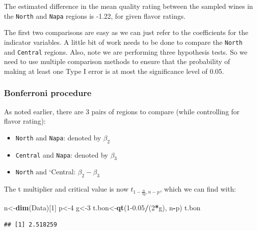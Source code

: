 \documentclass[
]{book}
\newenvironment{Shaded}{\begin{snugshade}}{\end{snugshade}}
\newcommand{\DecValTok}[1]{\textcolor[rgb]{0.00,0.00,0.81}{#1}}
\newcommand{\FloatTok}[1]{\textcolor[rgb]{0.00,0.00,0.81}{#1}}
\newcommand{\FunctionTok}[1]{\textcolor[rgb]{0.13,0.29,0.53}{\textbf{#1}}}
\newcommand{\NormalTok}[1]{#1}
\newcommand{\OtherTok}[1]{\textcolor[rgb]{0.56,0.35,0.01}{#1}}
\newcommand{\SpecialCharTok}[1]{\textcolor[rgb]{0.81,0.36,0.00}{\textbf{#1}}}
\providecommand{\tightlist}{%
  \setlength{\itemsep}{0pt}\setlength{\parskip}{0pt}}
\begin{document}
The estimated difference in the mean quality rating between the sampled wines in the \texttt{North} and \texttt{Napa} regions is -1.22, for given flavor ratings.

The first two comparisons are easy as we can just refer to the coefficients for the indicator variables. A little bit of work needs to be done to compare the \texttt{North} and \texttt{Central} regions. Also, note we are performing three hypothesis tests. So we need to use multiple comparison methods to ensure that the probability of making at least one Type I error is at most the significance level of 0.05.

\hypertarget{bonferroni-procedure-1}{%
\subsubsection*{Bonferroni procedure}\label{bonferroni-procedure-1}}

As noted earlier, there are 3 pairs of regions to compare (while controlling for flavor rating):

\begin{itemize}
\tightlist
\item
  \texttt{North} and \texttt{Napa}: denoted by \(\beta_ 2\)
\item
  \texttt{Central} and \texttt{Napa}: denoted by \(\beta_ 3\)
\item
  \texttt{North} and `Central: \(\beta_2 - \beta_3\)
\end{itemize}

The t multiplier and critical value is now \(t_{1-\frac{\alpha}{2g}, n-p}\), which we can find with:

\begin{Shaded}
\begin{Highlighting}[]
\NormalTok{n}\OtherTok{\textless{}{-}}\FunctionTok{dim}\NormalTok{(Data)[}\DecValTok{1}\NormalTok{]}
\NormalTok{p}\OtherTok{\textless{}{-}}\DecValTok{4}
\NormalTok{g}\OtherTok{\textless{}{-}}\DecValTok{3}
\NormalTok{t.bon}\OtherTok{\textless{}{-}}\FunctionTok{qt}\NormalTok{(}\DecValTok{1}\FloatTok{{-}0.05}\SpecialCharTok{/}\NormalTok{(}\DecValTok{2}\SpecialCharTok{*}\NormalTok{g), n}\SpecialCharTok{{-}}\NormalTok{p)}
\NormalTok{t.bon}
\end{Highlighting}
\end{Shaded}

\begin{verbatim}
## [1] 2.518259
\end{verbatim}
\end{document}
